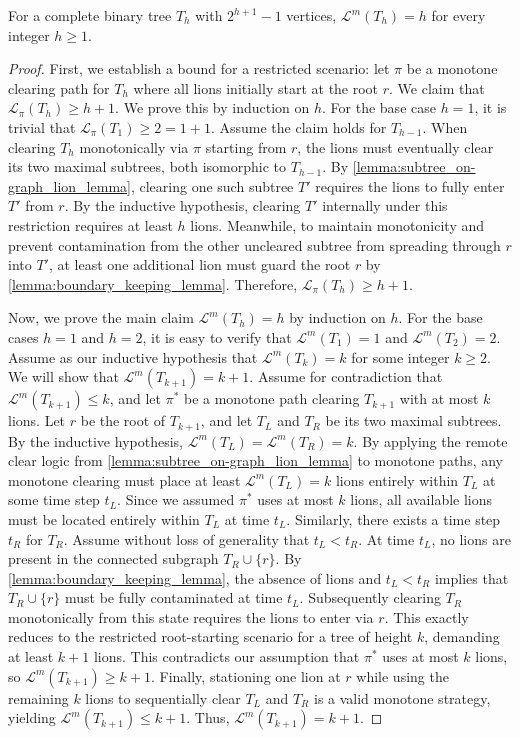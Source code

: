 \documentclass[a4paper,UKenglish,cleveref, autoref, thm-restate]{lipics-v2021}
\begin{document}
\begin{lemma}
    For a complete binary tree $T_h$ with $2^{h+1}-1$ vertices, $\mathcal{L}^m(T_h)=h$ for every integer $h \ge 1$.
\end{lemma}
\begin{proof}
First, we establish a bound for a restricted scenario: let $\pi$ be a monotone clearing path for $T_h$ where all lions initially start at the root $r$. We claim that $\mathcal{L}_\pi(T_h) \ge h+1$.
We prove this by induction on $h$. For the base case $h=1$, it is trivial that $\mathcal{L}_\pi(T_1) \ge 2 = 1+1$.
Assume the claim holds for $T_{h-1}$. When clearing $T_h$ monotonically via $\pi$ starting from $r$, the lions must eventually clear its two maximal subtrees, both isomorphic to $T_{h-1}$. By \cref{lemma:subtree_on-graph_lion_lemma}, clearing one such subtree $T'$ requires the lions to fully enter $T'$ from $r$. By the inductive hypothesis, clearing $T'$ internally under this restriction requires at least $h$ lions. Meanwhile, to maintain monotonicity and prevent contamination from the other uncleared subtree from spreading through $r$ into $T'$, at least one additional lion must guard the root $r$ by \cref{lemma:boundary_keeping_lemma}. Therefore, $\mathcal{L}_\pi(T_h) \ge h+1$.

Now, we prove the main claim $\mathcal{L}^m(T_h)= h$ by induction on $h$.
For the base cases $h=1$ and $h=2$, it is easy to verify that $\mathcal{L}^m(T_1)=1$ and $\mathcal{L}^m(T_2)=2$.
Assume as our inductive hypothesis that $\mathcal{L}^m(T_k)=k$ for some integer $k \ge 2$.
We will show that $\mathcal{L}^m(T_{k+1}) = k+1$.
Assume for contradiction that $\mathcal{L}^m(T_{k+1}) \le k$, and let $\pi^*$ be a monotone path clearing $T_{k+1}$ with at most $k$ lions.
Let $r$ be the root of $T_{k+1}$, and let $T_L$ and $T_R$ be its two maximal subtrees.
By the inductive hypothesis, $\mathcal{L}^m(T_L) = \mathcal{L}^m(T_R) = k$.
By applying the remote clear logic from \cref{lemma:subtree_on-graph_lion_lemma} to monotone paths, any monotone clearing must place at least $\mathcal{L}^m(T_L) = k$ lions entirely within $T_L$ at some time step $t_L$. Since we assumed $\pi^*$ uses at most $k$ lions, all available lions must be located entirely within $T_L$ at time $t_L$. Similarly, there exists a time step $t_R$ for $T_R$. Assume without loss of generality that $t_L < t_R$.
At time $t_L$, no lions are present in the connected subgraph $T_R \cup \{r\}$. 
By \cref{lemma:boundary_keeping_lemma}, the absence of lions and $t_L<t_R$ implies that $T_R\cup \{r\}$ must be fully contaminated at time $t_L$.
Subsequently clearing $T_R$ monotonically from this state requires the lions to enter via $r$. This exactly reduces to the restricted root-starting scenario for a tree of height $k$, demanding at least $k+1$ lions. This contradicts our assumption that $\pi^*$ uses at most $k$ lions, so $\mathcal{L}^m(T_{k+1}) \ge k+1$.
Finally, stationing one lion at $r$ while using the remaining $k$ lions to sequentially clear $T_L$ and $T_R$ is a valid monotone strategy, yielding $\mathcal{L}^m(T_{k+1}) \le k+1$.
Thus, $\mathcal{L}^m(T_{k+1}) = k+1$.
\end{proof}
\end{document}
